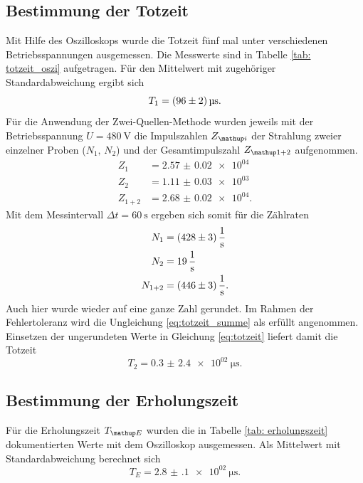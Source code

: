 \subsection{Bestimmung der Totzeit}
Mit Hilfe des Oszilloskops wurde die Totzeit fünf mal unter verschiedenen Betriebsspannungen ausgemessen. Die Messwerte
sind in Tabelle \ref{tab: totzeit_oszi} aufgetragen. Für den Mittelwert mit zugehöriger Standardabweichung ergibt sich
\begin{equation}
  T_1 = \SI{96 \pm 2}{\micro\second}.
\end{equation}
Für die Anwendung der Zwei-Quellen-Methode wurden jeweils mit der Betriebsspannung $U = \SI{480}{\volt}$ die
Impulszahlen $Z\ua{i}$ der Strahlung zweier einzelner Proben ($N_1,\, N_2$) und der Gesamtimpulszahl $Z\ua{1+2}$ aufgenommen.
\begin{align}
  Z_1 &= \num{2.57(2)e+04}\\
  Z_2 &= \num{1.11(3)e+03}\\
  Z_{1+2} &= \num{2.68(2)e+04}.
\end{align}%
Mit dem Messintervall $\Delta t = \SI{60}{\second}$ ergeben sich somit für die Zählraten
\begin{align}
  N_1 &= \SI{428 \pm 3}{\per\second}\\
  N_2 &= \SI{19(0) }{\per\second}\\
  N_{1+2} &= \SI{446 \pm 3}{\per\second}.
\end{align}%
Auch hier wurde wieder auf eine ganze Zahl gerundet. Im Rahmen der Fehlertoleranz wird die Ungleichung %
\eqref{eq:totzeit_summe} als erfüllt angenommen. Einsetzen der ungerundeten Werte in Gleichung \eqref{eq:totzeit} liefert damit die Totzeit %
\begin{equation}
  T_2 = \SI{0.3(24)e+02}{\micro\second}.
  \label{eq: res_totzeit}
\end{equation}



\subsection{Bestimmung der Erholungszeit}
Für die Erholungszeit $T\ua{E}$ wurden die in Tabelle \ref{tab: erholungszeit} dokumentierten Werte mit dem Oszilloskop ausgemessen. Als %
Mittelwert mit Standardabweichung berechnet sich
\begin{equation}
  T_E = \SI{2.8(1)e+02}{\micro\second}.
\end{equation}

